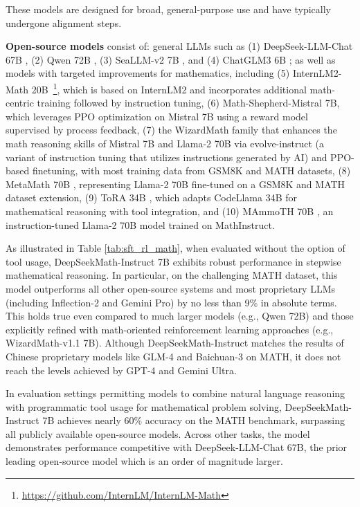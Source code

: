 These models are designed for broad, general-purpose use and have typically undergone alignment steps.

\item \textbf{Open-source models} consist of: general LLMs such as (1) DeepSeek-LLM-Chat 67B \citep{deepseek-llm}, (2) Qwen 72B \citep{qwen}, (3) SeaLLM-v2 7B \citep{seallm}, and (4) ChatGLM3 6B \citep{chatglm3}; as well as models with targeted improvements for mathematics, including (5) InternLM2-Math 20B~\footnote{\url{https://github.com/InternLM/InternLM-Math}}, which is based on InternLM2 and incorporates additional math-centric training followed by instruction tuning, (6) Math-Shepherd-Mistral 7B, which leverages PPO optimization \citep{schulman2017proximal} on Mistral 7B \citep{mistral} using a reward model supervised by process feedback, (7) the WizardMath family \citep{wizardmath} that enhances the math reasoning skills of Mistral 7B and Llama-2 70B \citep{llama2} via evolve-instruct (a variant of instruction tuning that utilizes instructions generated by AI) and PPO-based finetuning, with most training data from GSM8K and MATH datasets, (8) MetaMath 70B \citep{metamath}, representing Llama-2 70B fine-tuned on a GSM8K and MATH dataset extension, (9) ToRA 34B \cite{tora}, which adapts CodeLlama 34B for mathematical reasoning with tool integration, and (10) MAmmoTH 70B \citep{MathInstruct}, an instruction-tuned Llama-2 70B model trained on MathInstruct.

As illustrated in Table \ref{tab:sft_rl_math}, when evaluated without the option of tool usage, DeepSeekMath-Instruct 7B exhibits robust performance in stepwise mathematical reasoning. In particular, on the challenging MATH dataset, this model outperforms all other open-source systems and most proprietary LLMs (including Inflection-2 and Gemini Pro) by no less than 9\% in absolute terms. This holds true even compared to much larger models (e.g., Qwen 72B) and those explicitly refined with math-oriented reinforcement learning approaches (e.g., WizardMath-v1.1 7B). Although DeepSeekMath-Instruct matches the results of Chinese proprietary models like GLM-4 and Baichuan-3 on MATH, it does not reach the levels achieved by GPT-4 and Gemini Ultra.

In evaluation settings permitting models to combine natural language reasoning with programmatic tool usage for mathematical problem solving, DeepSeekMath-Instruct 7B achieves nearly 60\% accuracy on the MATH benchmark, surpassing all publicly available open-source models. Across other tasks, the model demonstrates performance competitive with DeepSeek-LLM-Chat 67B, the prior leading open-source model which is an order of magnitude larger.

